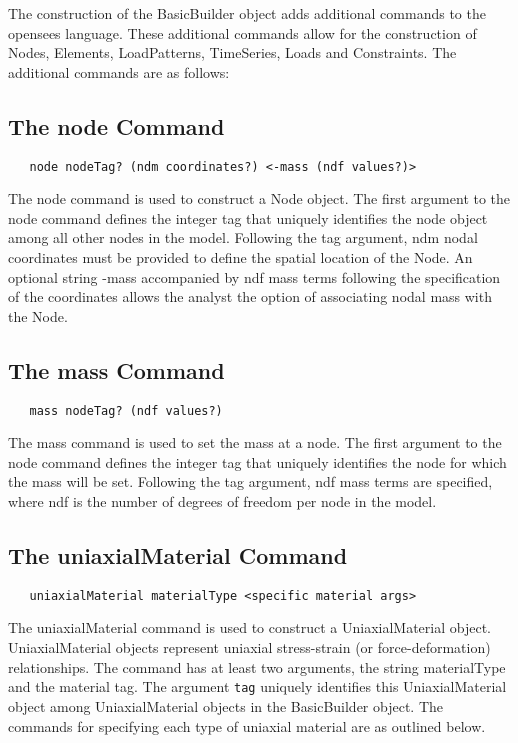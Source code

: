 \documentclass[12pt]{article}
\begin{document}
The construction of the BasicBuilder object adds additional commands
to the opensees language. These additional commands allow for the
construction of Nodes, Elements, LoadPatterns, TimeSeries, Loads and
Constraints. The additional commands are as follows:

\subsection{The node Command}
{\sf\small
\begin{verbatim}
   node nodeTag? (ndm coordinates?) <-mass (ndf values?)>
\end{verbatim}
}

The node command is used to construct a Node object. The first
argument to the node command defines the integer tag that uniquely
identifies the node object among all other nodes in the model. Following the tag
argument, ndm nodal coordinates must be provided to define the spatial
location of the Node. An optional string -mass accompanied by ndf
mass terms following the specification of the coordinates allows the
analyst the option of associating nodal mass with the Node.

\subsection{The mass Command}
{\sf\small
\begin{verbatim}
   mass nodeTag? (ndf values?)
\end{verbatim}
}

The mass command is used to set the mass at a node. The first
argument to the node command defines the integer tag that uniquely
identifies the node for which the mass will be set. Following the tag
argument, ndf mass terms are specified, where ndf is the number of
degrees of freedom per node in the model.

\subsection{The uniaxialMaterial Command}
{\sf\small
\begin{verbatim}
   uniaxialMaterial materialType <specific material args>
\end{verbatim}
}

The uniaxialMaterial command is used to construct a UniaxialMaterial object. 
UniaxialMaterial objects represent uniaxial stress-strain (or force-deformation)
relationships. The command has at least two arguments, the string
materialType and the material tag. The argument 
{\tt tag} uniquely identifies this UniaxialMaterial object among 
UniaxialMaterial objects in the BasicBuilder object.
The commands for specifying each
type of uniaxial material are as outlined below.
\end{document}
